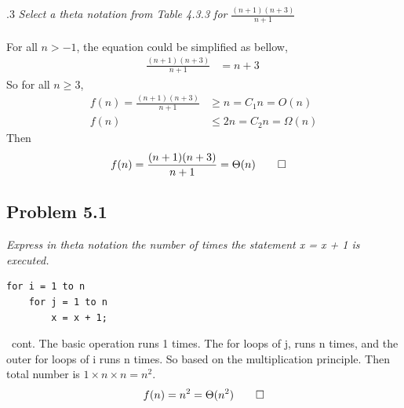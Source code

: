 \documentclass{beamer}
\begin{document}
        \begin{frame}[c,shrink]{\subsecname{}.3}
            \textit{Select a theta notation from Table 4.3.3 for $\frac{(n+1)(n+3)}{n+1}$}\\
            $\;$\\\pause  
            For all $n > -1$, the equation could be simplified as bellow,   
            \begin{align*}
                \frac{(n+1)(n+3)}{n+1}			&= n+3\ 
            \end{align*}\pause
            So for all $n \geq 3$,
            \begin{align*}
                f(n) = \frac{(n+1)(n+3)}{n+1} &\geq n = C_1n = O(n)\\
                                         f(n) &\leq 2n = C_2n = \Omega(n)
            \end{align*} \pause
            Then           
            \begin{align*}
                f(n) = \frac{(n+1)(n+3)}{n+1} &= \Theta(n) \qed
            \end{align*}
        \end{frame}
        
        
        
    \subsection{Problem 5.1}
    
        \begin{frame}[c,containsverbatim]{\subsecname}
            \textit{Express in theta notation the number of times the statement x = x + 1 is
executed.}
            \begin{lstlisting}
for i = 1 to n
    for j = 1 to n
        x = x + 1;
            \end{lstlisting}
        \end{frame}
        
        \begin{frame}[c]{\subsecname\ cont.}
            The basic operation runs 1 times. The for loops of j, runs n times, and the outer for loops of i runs n times. So based on the multiplication principle. Then total number is $1\times n \times n=n^2$.\pause
            \begin{align*}
            f(n)=n^2=\Theta(n^2) \qed
            \end{align*}
        \end{frame}
        
\end{document}
